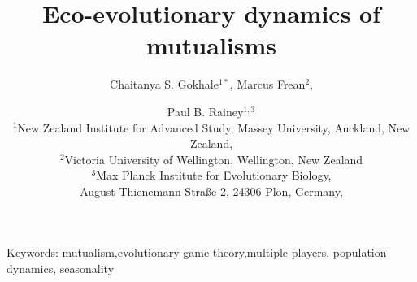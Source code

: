 \documentclass[12pt]{article}
\title{\vspace*{-22mm}\bf Eco-evolutionary dynamics of mutualisms}
\author{Chaitanya S. Gokhale$^{1*}$,
Marcus Frean$^{2}$,
 \and Paul B. Rainey$^{1,3}$ \\
\normalsize $^{1}$New Zealand Institute for Advanced Study, Massey University, Auckland, New Zealand, \\
\normalsize $^2$Victoria University of Wellington, Wellington, New Zealand\\
\normalsize $^3$Max Planck Institute for Evolutionary Biology, \\
\normalsize August-Thienemann-Stra{\ss}e 2, 24306 Pl\"{o}n, Germany,\\
}
\date{}
\newcommand{\paul}[1]{\textcolor{red}{(#1)}}
\begin{document}
\maketitle

\begin{abstract}
\end{abstract}

\noindent
Keywords: mutualism,evolutionary game theory,multiple players, population dynamics, seasonality

\tableofcontents
\end{document}
